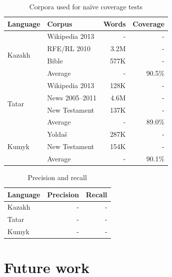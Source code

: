 \documentclass[a4paper,11pt,twocolumn]{article}
\begin{document}

\begin{table}
\begin{center}
\begin{tabular}{llrr}
\toprule
\textbf{Language} & \textbf{Corpus} & \textbf{Words} & \textbf{Coverage} \\
\midrule
\multirow{4}{*}{Kazakh} & Wikipedia 2013 &  -  &  - \\
	& RFE/RL 2010 & 3.2M & - \\
	& Bible & 577K & - \\\cline{2-4}
	& Average & - & 90.5\% \\
\midrule
\multirow{4}{*}{Tatar} & Wikipedia 2013 & 128K &  - \\
	& News 2005--2011 & 4.6M & - \\
	& New Testament & 137K & - \\\cline{2-4}
	& Average & - & 89.0\% \\
\midrule
\multirow{3}{*}{Kumyk} & Yoldaš & 287K &  - \\
	& New Testament & 154K & - \\\cline{2-4}
	& Average & - & 90.1\% \\
\bottomrule
\end{tabular}
 \caption{Corpora used for naïve coverage tests}
 \label{table:corpora}
\end{center}
\end{table}



\begin{table}
\begin{center}
	\begin{tabular}{lrr}
	\toprule
		\textbf{Language} & \textbf{Precision} & \textbf{Recall} \\
	\midrule
		Kazakh & - &  - \\
		Tatar & - & - \\
		Kumyk & - & - \\
	\bottomrule
	\end{tabular}
	\caption{Precision and recall}
	\label{table:coverage}
\end{center}
\end{table}



\section{Future work}
\end{document}
